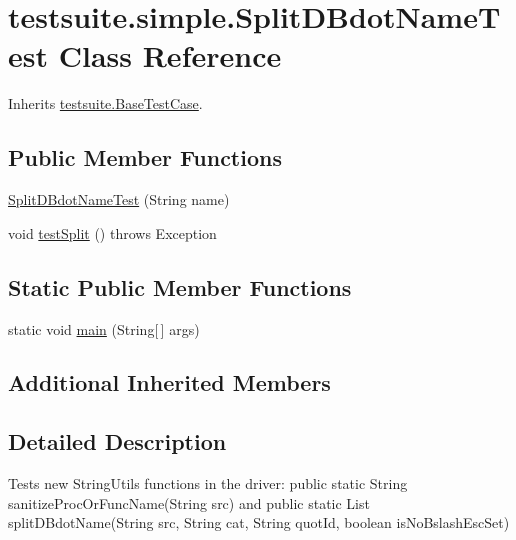 \hypertarget{classtestsuite_1_1simple_1_1_split_d_bdot_name_test}{}\section{testsuite.\+simple.\+Split\+D\+Bdot\+Name\+Test Class Reference}
\label{classtestsuite_1_1simple_1_1_split_d_bdot_name_test}


Inherits \mbox{\hyperlink{classtestsuite_1_1_base_test_case}{testsuite.\+Base\+Test\+Case}}.

\subsection*{Public Member Functions}
\begin{DoxyCompactItemize}
\item 
\mbox{\hyperlink{classtestsuite_1_1simple_1_1_split_d_bdot_name_test_ac0705ebb305a60c8c7e932f358c79039}{Split\+D\+Bdot\+Name\+Test}} (String name)
\item 
void \mbox{\hyperlink{classtestsuite_1_1simple_1_1_split_d_bdot_name_test_a079789e05d1272485f650f92c91777fa}{test\+Split}} ()  throws Exception 
\end{DoxyCompactItemize}
\subsection*{Static Public Member Functions}
\begin{DoxyCompactItemize}
\item 
static void \mbox{\hyperlink{classtestsuite_1_1simple_1_1_split_d_bdot_name_test_acb8ba7fcbc46d143cfda1afb2530249b}{main}} (String\mbox{[}$\,$\mbox{]} args)
\end{DoxyCompactItemize}
\subsection*{Additional Inherited Members}


\subsection{Detailed Description}
Tests new String\+Utils functions in the driver\+: public static String sanitize\+Proc\+Or\+Func\+Name(\+String src) and public static List split\+D\+Bdot\+Name(String src, String cat, String quot\+Id, boolean is\+No\+Bslash\+Esc\+Set)

